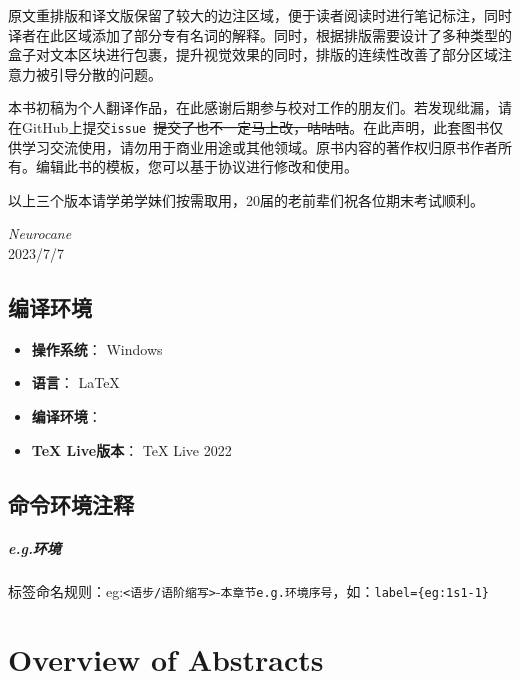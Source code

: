\documentclass[a4paper]{ctexbook}
\begin{document}
原文重排版和译文版保留了较大的边注区域，便于读者阅读时进行笔记标注，同时译者在此区域添加了部分专有名词的解释。同时，根据排版需要设计了多种类型的盒子对文本区块进行包裹，提升视觉效果的同时，排版的连续性改善了部分区域注意力被引导分散的问题。

本书初稿为个人翻译作品，在此感谢后期参与校对工作的朋友们。若发现纰漏，请在GitHub上提交\verb|issue|~\sout{提交了也不一定马上改，咕咕咕}。在此声明，此套图书仅供学习交流使用，请勿用于商业用途或其他领域。原书内容的著作权归原书作者所有。编辑此书的模板，您可以基于协议进行修改和使用。

以上三个版本请学弟学妹们按需取用，20届的老前辈们祝各位期末考试顺利。

\vfill

\begin{flushright}
    \emph{Neurocane}\\
    2023/7/7
\end{flushright}

\newpage

\section*{编译环境}

\begin{itemize}
    \item \textbf{操作系统}： Windows
    \item \textbf{语言}： \LaTeX
    \item \textbf{编译环境}： \XeLaTeX
    \item \textbf{TeX Live版本}： TeX Live 2022
\end{itemize}

\section*{命令环境注释}

\paragraph*{e.g.环境} 标签命名规则：eg:\verb|<语步/语阶缩写>|-\verb|本章节e.g.环境序号|，如：\verb|label={eg:1s1-1}|

\tableofcontents

\mainmatter


\chapter{Overview of Abstracts}\label{chapter1}
\end{document}
